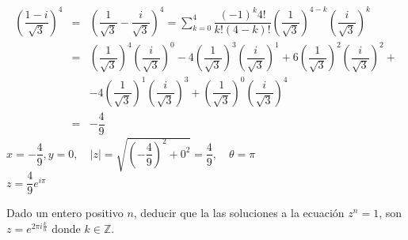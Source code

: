 \documentclass[twoside]{book}
\begin{document}
\begin{sol}
\begin{solucion}{}
\begin{enumerate}
\begin{eqnarray*}
                      \left(\dfrac{1-i}{\sqrt{3}}\right)^4&=&\left(\dfrac{1}{\sqrt{3}}-\dfrac{i}{\sqrt{3}}\right)^4=\displaystyle\sum_{k=0}^{4}\dfrac{(-1)^k4!}{k!(4-k)!}\left(\dfrac{1}{\sqrt{3}}\right)^{4-k}\left(\dfrac{i}{\sqrt{3}}\right)^k\\ &=&\left(\dfrac{1}{\sqrt{3}}\right)^{4}\left(\dfrac{i}{\sqrt{3}}\right)^0-4\left(\dfrac{1}{\sqrt{3}}\right)^{3}\left(\dfrac{i}{\sqrt{3}}\right)^1+6\left(\dfrac{1}{\sqrt{3}}\right)^{2}\left(\dfrac{i}{\sqrt{3}}\right)^2+\\
                      &&-4\left(\dfrac{1}{\sqrt{3}}\right)^{1}\left(\dfrac{i}{\sqrt{3}}\right)^3+\left(\dfrac{1}{\sqrt{3}}\right)^{0}\left(\dfrac{i}{\sqrt{3}}\right)^4\\&=&-\dfrac{4}{9}
                  \end{eqnarray*}
                  $x=-\dfrac{4}{9},y=0,\quad |z|=\sqrt{\left(-\dfrac{4}{9}\right)^2+0^2}=\dfrac{4}{9},\quad \theta=\pi$\\
                  $\boxed{z=\dfrac{4}{9}e^{i\pi}}$
        \end{enumerate}

    \end{solucion}
\end{sol}
\begin{example}{}
    Dado un entero positivo $n$, deducir que la las soluciones a la ecuaci\'on $z^n=1$, son $z=e^{2\pi i\frac{k}{n}}$ donde $k\in\mathbb{Z}$.
\end{example}
\end{document}
